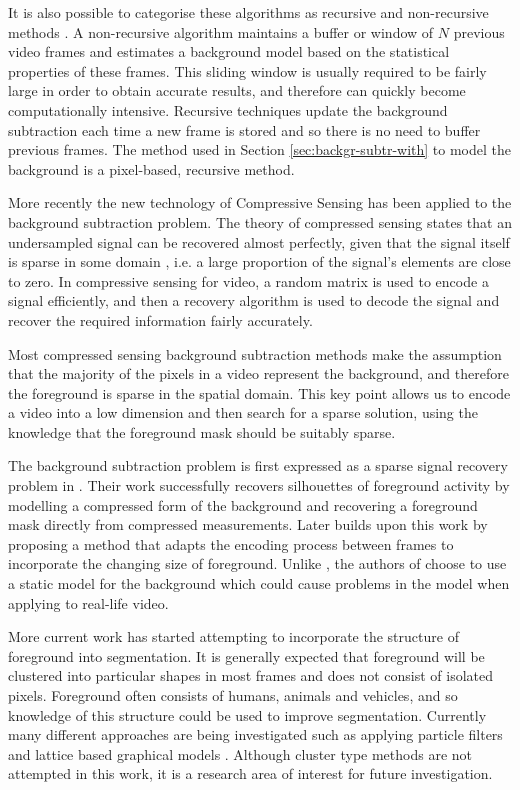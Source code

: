 It is also possible to categorise these algorithms as recursive and non-recursive methods \cite{Bouwmans2011}. A non-recursive algorithm maintains a buffer or window of $N$ previous video frames and estimates a background model based on the statistical properties of these frames. This sliding window is usually required to be fairly large in order to obtain accurate results, and therefore can quickly become computationally intensive. Recursive techniques update the background subtraction each time a new frame is stored and so there is no need to buffer previous frames. The method used in Section \ref{sec:backgr-subtr-with} to model the background is a pixel-based, recursive method.

More recently the new technology of Compressive Sensing \cite{Candes2006, Candes2006a, Donoho2006} has been applied to the background subtraction problem. The theory of compressed sensing states that an undersampled signal can be recovered almost perfectly, given that the signal itself is sparse in some domain \cite{Baraniuk2007}, i.e. a large proportion of the signal's elements are close to zero. In compressive sensing for video, a random matrix is used to encode a signal efficiently, and then a recovery algorithm is used to decode the signal and recover the required information fairly accurately. 

Most compressed sensing background subtraction methods \cite{Cevher2008a, Cevher2008b, Warnell2011, Cossalter2009} make the assumption that the majority of the pixels in a video represent the background, and therefore the foreground is sparse in the spatial domain. This key point allows us to encode a video into a low dimension and then search for a sparse solution, using the knowledge that the foreground mask should be suitably sparse. 

The background subtraction problem is first expressed as a sparse signal recovery problem in \cite{Cevher2008b}. Their work successfully recovers silhouettes of foreground activity by modelling a compressed form of the background and recovering a foreground mask directly from compressed measurements. Later \cite{Warnell2011} builds upon this work by proposing a method that adapts the encoding process between frames to incorporate the changing size of foreground. Unlike \cite{Cevher2008b}, the authors of \cite{Warnell2011} choose to use a static model for the background which could cause problems in the model when applying to real-life video. 

More current work has started attempting to incorporate the structure of foreground into segmentation. It is generally expected that foreground will be clustered into particular shapes in most frames and does not consist of isolated pixels. Foreground often consists of humans, animals and vehicles, and so knowledge of this structure could be used to improve segmentation. Currently many different approaches are being investigated such as applying particle filters \cite{Cossalter2009} and lattice based graphical models \cite{Cevher2008a}. Although cluster type methods are not attempted in this work, it is a research area of interest for future investigation. 

